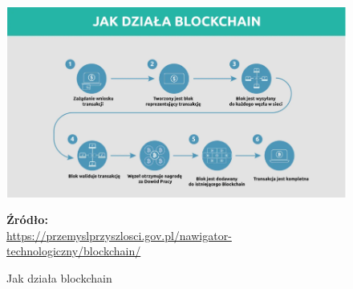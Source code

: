 \documentclass[12pt,a4paper,twoside, inzynierska]{pwr_wmat_praca_dyplomowa}
\theoremstyle{plain}
\numberwithin{theorem}{chapter}
\theoremstyle{definition}
\numberwithin{theorem}{chapter}
\begin{document}
	\vspace{12pt} %
	\begin{figure}[ht!]
		\centering
		\includegraphics[width=\linewidth]{Jakdzialablockchain.png}
		\caption{Jak działa blockchain} %
		\label{fig:blockchain}
		\textbf{Źródło:} \\
		\url{https://przemyslprzyszlosci.gov.pl/nawigator-technologiczny/blockchain/}
	\end{figure}
	\vspace{12pt} %
	
\end{document}
